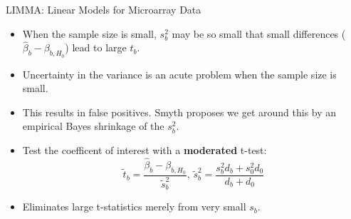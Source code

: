 \documentclass[12pt,t]{beamer}
\begin{document}
\begin{frame}[c]{LIMMA: Linear Models for Microarray Data}

\begin{center}
\begin{itemize}
  \itemsep12pt
  \item When the sample size is small, $s^2_b$ may be so small that small
    differences ($\hat{\beta}_{b} - \beta_{b, H_0}$) lead to large $t_{b}$.
  \item Uncertainty in the variance is an acute problem when the sample size is
    small.
  \item This results in false positives. Smyth proposes we get around this by an
    empirical Bayes shrinkage of the $s^2_b$.
  \item Test the coefficent of interest with a \textbf{moderated} t-test:
    \[
      \tilde{t}_{b} = \frac{\hat{\beta}_{b} - \beta_{b, H_0}}{\tilde{s}^2_b},
      \,
      \tilde{s}^2_b = \frac{s^2_bd_b + s^2_0d_0}{d_b + d_0}
    \]
  \item Eliminates large t-statistics merely from very small $s_b$.
\end{itemize}
\end{center}

\end{frame}
\end{document}
